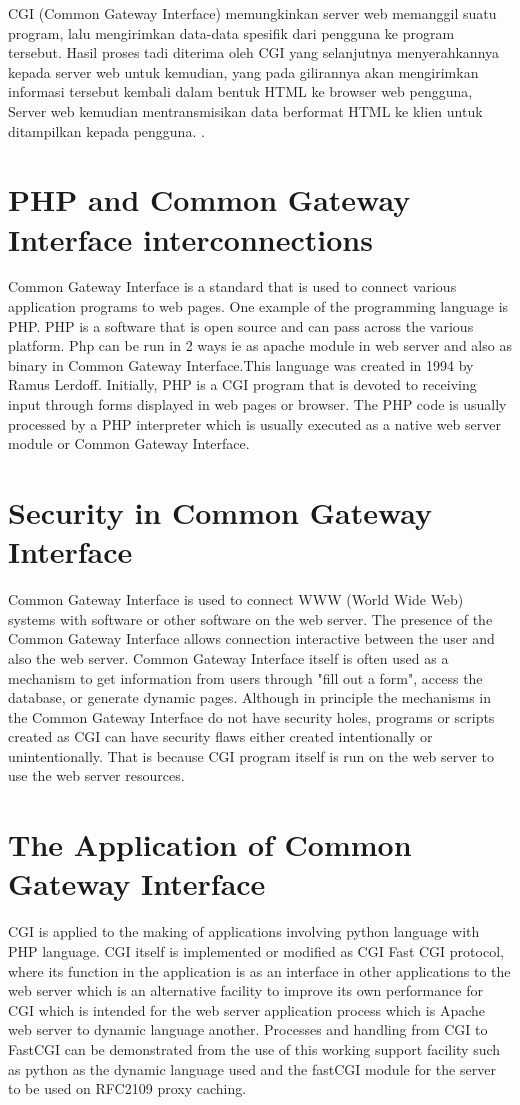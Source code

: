\par  CGI (Common Gateway Interface) memungkinkan server web memanggil suatu program, lalu mengirimkan data-data spesifik dari pengguna ke program tersebut.
 Hasil proses tadi diterima oleh CGI yang selanjutnya menyerahkannya kepada server web untuk kemudian, yang pada gilirannya akan mengirimkan
informasi tersebut kembali dalam bentuk HTML ke browser web pengguna, Server web kemudian mentransmisikan data berformat HTML ke klien untuk ditampilkan kepada pengguna. \cite{ibrahim2011sistem}.

\section{PHP and Common Gateway Interface interconnections }
Common Gateway Interface is a standard that is used to connect various application programs to web pages. One example of the programming language is PHP. PHP is a software that is open source and can pass across the various platform. Php can be run in 2 ways ie as apache module in web server and also as binary in Common Gateway Interface.This language was created in 1994 by Ramus Lerdoff.  Initially, PHP is a CGI program that is devoted to receiving input through forms displayed in web pages or browser. The PHP code is usually processed by a PHP interpreter which is usually executed as a native web server module or Common Gateway Interface\cite{nahado2015bumbu}.


\section{Security in Common Gateway Interface }
Common Gateway Interface is used to connect WWW (World Wide Web) systems with software or other software on the web server. The presence of the Common Gateway Interface allows connection interactive between the user and also the web server. Common Gateway Interface itself is often used as a mechanism to get information from users through "fill out a form", access the database, or generate dynamic pages. Although in principle the mechanisms in the Common Gateway Interface do not have security holes, programs or scripts created as CGI can have security flaws either created intentionally or unintentionally. That is because CGI program itself is run on the web server to use the web server resources.


\section{The Application of Common Gateway Interface }
CGI is applied to the making of applications involving python language with PHP language. CGI itself is implemented or modified as CGI Fast CGI protocol, where its function in the application is as an interface in other applications to the web server which is an alternative facility to improve its own performance for CGI which is intended for the web server application process which is Apache web server to dynamic language another. Processes and handling from CGI to FastCGI can be demonstrated from the use of this working support facility such as python as the dynamic language used and the fastCGI module for the server to be used on RFC2109 proxy caching.


